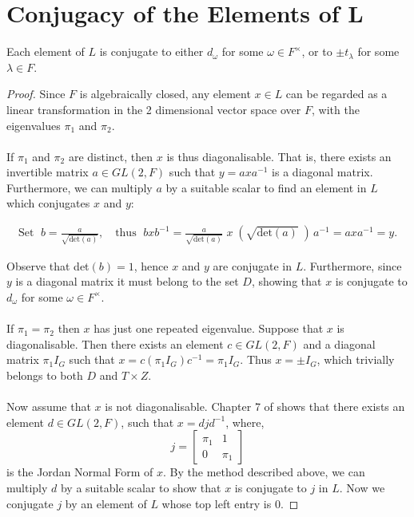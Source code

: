 \section[Conjugacy of the Elements of $L$]{Conjugacy of the Elements of $\pmb{L}$}

\begin{proposition}\label{6.3} Each element of $L$ is conjugate to either $d_\omega$ for some $\omega \in F^\times$, or to $\pm t_\lambda$ for some $\lambda \in F$.
\end{proposition}

\begin{proof} Since $F$ is algebraically closed, any element $x \in L$ can be regarded as a linear transformation in the 2 dimensional vector space over $F$, with the eigenvalues $\pi_1$ and $\pi_2$. \\
\\
\space If $\pi_1$ and $\pi_2$ are distinct, then $x$ is thus diagonalisable. That is, there exists an invertible matrix $a \in GL(2, F)$ such that $y = axa^{-1}$ is a diagonal matrix. Furthermore, we can multiply $a$ by a suitable scalar to find an element in $L$ which conjugates $x$ and $y$:

\begin{align*} \text{Set } \; b = \frac{a}{\sqrt {\text{det}(a)}}, \quad \text{thus } \; bxb^{-1} =\frac{a}{\sqrt {\text{det}(a)}} \; x \; (\sqrt{\text{det}(a)} \; )\,a^{-1} = axa^{-1} = y.
\end{align*}

Observe that det$(b)=1$, hence $x$ and $y$ are conjugate in $L$. Furthermore, since $y$ is a diagonal matrix it must belong to the set $D$, showing that $x$ is conjugate to $d_\omega$ for some $\omega \in F^\times$. \\
\\
\space If $\pi_1 = \pi_2$ then $x$ has just one repeated eigenvalue. Suppose that $x$ is diagonalisable. Then there exists an element $c \in GL(2, F)$ and a diagonal matrix $\pi_1 I_G$ such that $x = c(\pi_1 I_G)c^{-1} = \pi_1 I_G$. Thus $x = \pm I_G$, which trivially belongs to both $D$ and $T \times Z$. \\
\\
Now assume that $x$ is not diagonalisable. Chapter 7 of \cite{matrix} shows that there exists an element $d \in GL(2, F)$, such that $x= djd^{-1}$, where, $$j = \begin{bmatrix} \pi_1 & 1 \\ 0 & \pi_1 \end{bmatrix}$$ is the Jordan Normal Form of $x$. By the method described above, we can multiply $d$ by a suitable scalar to show that $x$ is conjugate to $j$ in $L$. Now we conjugate $j$ by an element of $L$ whose top left entry is 0.


\end{proof}
